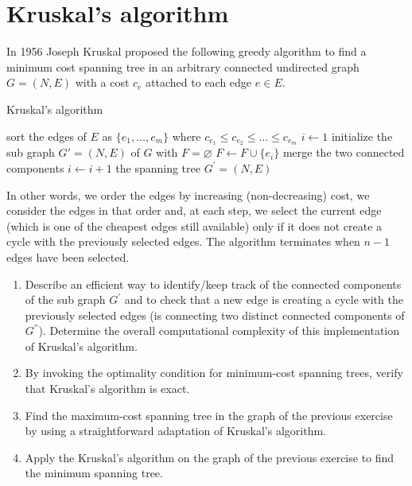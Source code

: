 \documentclass[12pt, a4paper]{report}
\newtheorem[style=M,bodystyle=\normalfont]{theorem}{Theorem}
\newtheorem[style=M,bodystyle=\normalfont]{corollary}{Corollary}
\newtheorem[style=M,bodystyle=\normalfont]{lemma}{Lemma}
\newtheorem[style=M,bodystyle=\normalfont]{definition}{Definition}
\begin{document}
    \newpage

    \section{Kruskal's algorithm}
        In 1956 Joseph Kruskal proposed the following greedy algorithm to find a minimum cost spanning tree in an arbitrary connected undirected graph $G = (N, E)$ with a cost
        $c_e$ attached to each edge $e \in E$. 
        \begin{algorithm}[H]
            \caption{Kruskal's algorithm}
                \begin{algorithmic}[1]
                    \State sort the edges of $E$ as $\{e_1,\dots,e_m\}$ where $c_{e_1} \leq c_{e_2} \leq \dots \leq c_{e_m}$
                    \State $i \leftarrow 1$
                    \State initialize the sub graph $G' = (N, E)$ of $G$ with $F=\varnothing$
                            \State $F \leftarrow F \cup \{e_i\}$
                            \State merge the two connected components 
                        \EndIf 
                        \State $i \leftarrow i+1$
                    \EndWhile
                    \State \Return the spanning tree $G^{'} = (N, E)$ 
                \end{algorithmic}
        \end{algorithm}
        In other words, we order the edges by increasing (non-decreasing) cost, we consider the edges in that order and, at each step, we select the current edge (which is 
        one of the cheapest edges still available) only if it does not create a cycle with the previously selected edges. The algorithm terminates when $n-1$ edges have
        been selected. 
        \begin{enumerate}
            \item Describe an efficient way to identify/keep track of the connected components of the sub graph $G^{'}$ and to check that a new edge is creating a cycle with 
                the previously selected edges (is connecting two distinct connected components of $G^{''}$). Determine the overall computational complexity of this 
                implementation of Kruskal's algorithm. 
            \item By invoking the optimality condition for minimum-cost spanning trees, verify that Kruskal's algorithm is exact. 
            \item Find the maximum-cost spanning tree in the graph of the previous exercise by using a straightforward adaptation of Kruskal's algorithm. 
            \item Apply the Kruskal's algorithm on the graph of the previous exercise to find the minimum spanning tree. 
        \end{enumerate}
\end{document}
